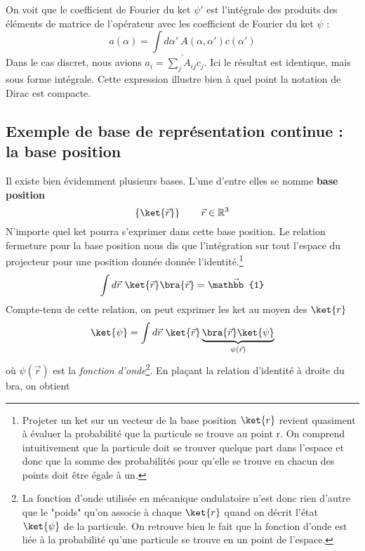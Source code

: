 On voit que le coefficient de Fourier du ket $\psi'$ est l'intégrale des produits des éléments de matrice
de l'opérateur avec les coefficient de Fourier du ket $\psi$ :
\begin{equation}
\underline{a(\alpha) = \int d\alpha'\ A(\alpha,\alpha')c(\alpha')}
\end{equation}
Dans le cas discret, nous avions $a_i = \sum_j A_{ij}c_j$. Ici le résultat est identique, 
mais sous forme intégrale. Cette expression illustre bien à quel point la notation de 
Dirac est compacte.


\subsection{Exemple de base de représentation continue : la base position}
Il existe bien évidemment plusieurs bases. L'une d'entre elles se nomme 
\textbf{base position}
\begin{equation}
\left\{\ket{\vec{r}}\right\}\qquad \vec{r}\in\mathbb{R}^3
\end{equation}
N'importe quel ket pourra s'exprimer dans cette base position. Le relation 
fermeture pour la base position nous dis que l'intégration sur tout l'espace
du projecteur pour une position donnée donnée l'identité.\footnote{Projeter
un ket sur un vecteur de la base position $\ket{r}$ revient quasiment à évaluer la 
probabilité que la particule se trouve au point r. On comprend intuitivement
que la particule doit se trouver quelque part dans l'espace et donc que
la somme des probabilités pour qu'elle se trouve en chacun des points doit
être égale à un.}
\begin{equation}
\int d\vec{r}\ \ket{\vec{r}}\bra{\vec{r}} = \vec{\mathbb{1}}
\end{equation}
Compte-tenu de cette relation, on peut exprimer les ket au moyen des $\ket{r}$
\begin{equation}
\ket{\psi} = \int d\vec{r}\ \ket{\vec{r}}\underbrace{\bra{\vec{r}}\ket{
\psi}}_{\psi(\vec{r})}
\end{equation}
où $\psi(\vec{r})$ est la \textit{fonction d'onde}\footnote{La fonction d'onde
utilisée en mécanique ondulatoire n'est donc rien d'autre que le "poids" qu'on associe
à chaque $\ket{r}$ quand on décrit l'état $\ket{\psi}$ de la particule. On retrouve
bien le fait que la fonction d'onde est liée à la probabilité qu'une particule se trouve
en un point de l'espace.}. En plaçant la relation 
d'identité à droite du bra, on obtient
